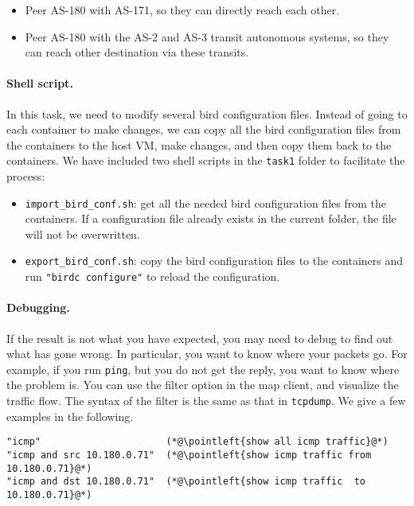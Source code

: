 \begin{itemize}[noitemsep]
  \item Peer AS-180 with AS-171, so they can directly reach each other.
  \item Peer AS-180 with the AS-2 and AS-3 transit autonomous systems, so they can
    reach other destination via these transits.
\end{itemize}

\paragraph{Shell script.}
In this task, we need to modify several bird configuration files.
Instead of going to each container to make changes, we can copy
all the bird configuration files from the containers to the host VM,
make changes, and then copy them back to the containers.
We have included two shell scripts in the \texttt{task1} folder
to facilitate the process:

\begin{itemize}[noitemsep]
  \item \texttt{import\_bird\_conf.sh}:
    get all the needed bird configuration files from the containers.
    If a configuration file already exists in the current folder,
    the file will not be overwritten.

  \item \texttt{export\_bird\_conf.sh}: copy the bird configuration
    files to the containers and run \texttt{"birdc configure"}
    to reload the configuration.
\end{itemize}


\paragraph{Debugging.}
If the result is not what you have expected, 
you may need to debug to find out what has gone wrong. In particular, 
you want to know where your packets go. For example, if you run \texttt{ping},
but you do not get the reply, you want to know where the problem is. You can
use the filter option in the map client, and visualize the traffic flow.  
The syntax of the filter is the same as that in \texttt{tcpdump}.
We give a few examples in the following.

\begin{lstlisting}
"icmp"                      (*@\pointleft{show all icmp traffic}@*) 
"icmp and src 10.180.0.71"  (*@\pointleft{show icmp traffic from 10.180.0.71}@*)
"icmp and dst 10.180.0.71"  (*@\pointleft{show icmp traffic  to 10.180.0.71}@*)
\end{lstlisting}
 

